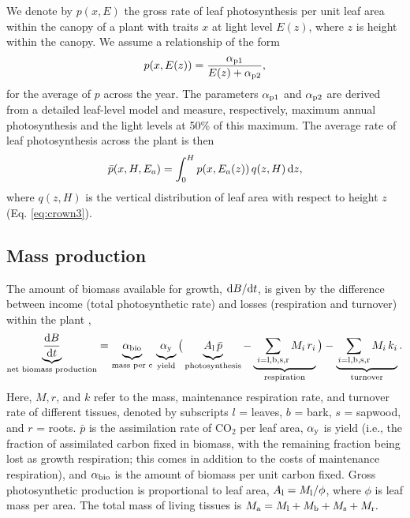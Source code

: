 \documentclass[10pt,twoside]{article}
\begin{document}
We denote by \(p(x, E)\) the gross rate of leaf photosynthesis per unit
leaf area within the canopy of a plant with traits \(x\) at light
level \(E(z)\), where \(z\) is height within the canopy.
We assume a relationship of the form
\begin{equation}\label{eq:photosynthesis}
p(x, E(z)) = \frac{\alpha_{{\rm p1}}}{E(z) + \alpha_{{\rm p2}}},
\end{equation}
for the average of \(p\) across the year. The parameters
\(\alpha_{{\rm p1}}\) and \(\alpha_{{\rm p2}}\) are derived from a detailed leaf-level
model and measure, respectively, maximum annual photosynthesis and the light levels at 50\% of this maximum. The average rate of
leaf photosynthesis across the plant is then
\begin{equation}\label{eq:photosynthesis_av}
\bar{p}(x, H, E_{a}) = \int_0^H p(x, E_a(z)) \, q(z, H) \, {\rm d}z,
\end{equation}
where \(q(z, H)\) is the vertical distribution of leaf area with respect to height \(z\) (Eq.
\ref{eq:crown3}).

\subsection{Mass production}\label{standard-model-for-mass-production}

The amount of biomass available for growth,
\({\rm d}B  / {\rm d}t\), is given by the difference between income
(total photosynthetic rate) and losses (respiration and turnover) within the
plant \citep{Makela-1997, Thornley-2000, Falster-2011},
\begin{equation}\label{eq:dbdt}
\underbrace{\strut \frac{{\rm d}B}{{\rm d}t}}_\textrm{net biomass production}
= \underbrace{\strut \alpha_{\rm bio} }_\textrm{mass per c} \,
\underbrace{\strut \alpha_{\rm y} }_\textrm{yield}
\big( \underbrace{\strut A_{\rm l} \, \bar{p}}_\textrm{photosynthesis} -
\underbrace{\strut \, \sum_{i = {\rm l}, {\rm b}, {\rm s}, {\rm r}}{M_i \, r_i}}_\textrm{respiration}\big)
- \underbrace{\strut \sum_{i = {\rm l}, {\rm b}, {\rm s},  {\rm r}}{M_i \, k_i}}_\textrm{turnover}.
\end{equation}
Here, \(M, r\), and \(k\) refer to the mass, maintenance respiration rate, and
turnover rate of different tissues, denoted by subscripts \(l\) = leaves,
\(b\) = bark, \(s\) = sapwood, and \(r\) = roots. \(\bar{p}\) is the assimilation
rate of CO\(_2\) per leaf area, \(\alpha_{\rm y}\) is yield (i.e., the fraction of
assimilated carbon fixed in biomass, with the remaining fraction being lost
as growth respiration; this comes in addition
to the costs of maintenance respiration), and \(\alpha_{\rm bio}\) is the amount of biomass per unit carbon fixed. Gross photosynthetic production is proportional to leaf area,
\(A_{\rm l} = M_{\rm l} / \phi\), where \(\phi\) is leaf mass per
area. The total mass of living tissues is
\(M_{\rm a} = M_{\rm l} + M_{\rm b} + M_{\rm s} + M_{\rm r}.\)
\end{document}
